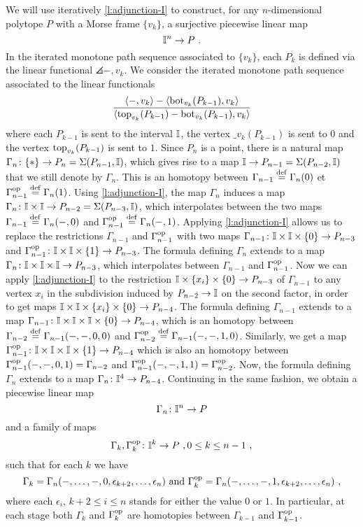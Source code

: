 We will use iteratively \cref{l:adjunction-I} to construct, for any $n$-dimensional polytope $P$ with a Morse frame $\{v_k\}$, a surjective piecewise linear map
\[
\mathbb{I}^n \to P \ .
\]
In the iterated monotone path sequence associated to $\{v_k\}$, each $P_k$ is defined via the linear functional $\angles{-,v_k}$.
We consider the iterated monotone path sequence associated to the linear functionals
\begin{equation} \label{eq:new-projection}
	\frac{\langle-,v_k\rangle-\langle\operatorname{bot}_{v_k}(P_{k-1}),v_k\rangle}{\langle\operatorname{top}_{v_k}(P_{k-1})-\operatorname{bot}_{v_k}(P_{k-1}),v_k\rangle}
\end{equation}
where each $P_{k-1}$ is sent to the interval $\mathbb{I}$, the vertex $\bm_{v_k}(P_{k-1})$ is sent to $0$ and the vertex $\operatorname{top}_{v_k}(P_{k-1})$ is sent to $1$.
Since $P_n$ is a point, there is a natural map $\Gamma_n \colon \{*\} \to P_n=\Sigma(P_{n-1},\mathbb{I})$, which gives rise to a map $\mathbb{I} \to P_{n-1}=\Sigma(P_{n-2},\mathbb{I})$ that we still denote by $\Gamma_n$. 
This is an homotopy between $\Gamma_{n-1} \stackrel{\mathrm{def}}{=} \Gamma_n(0)$ et $\Gamma_{n-1}^{\mathrm{op}} \stackrel{\mathrm{def}}{=} \Gamma_n(1)$.
Using \cref{l:adjunction-I}, the map $\Gamma_n$ induces a map $\Gamma_{n} \colon \mathbb{I} \times \mathbb{I} \to P_{n-2}=\Sigma(P_{n-3},\mathbb{I})$, which interpolates between the two maps $\Gamma_{n-1} \stackrel{\mathrm{def}}{=} \Gamma_{n}(-,0)$ and $\Gamma_{n-1}^{\mathrm{op}} \stackrel{\mathrm{def}}{=} \Gamma_{n}(-,1)$. 
Applying \cref{l:adjunction-I} allows us to replace the restrictions $\Gamma_{n-1}$ and $\Gamma_{n-1}^{\mathrm{op}}$ with two maps $\Gamma_{n-1} \colon \mathbb{I} \times \mathbb{I} \times \{0\} \to P_{n-3}$ and $\Gamma_{n-1}^{\mathrm{op}} \colon \mathbb{I} \times \mathbb{I} \times \{1\}  \to P_{n-3}$. 
The formula defining $\Gamma_{n}$ extends to a map $\Gamma_{n} \colon \mathbb{I} \times \mathbb{I} \times \mathbb{I} \to P_{n-3}$, which interpolates between $\Gamma_{n-1}$ and $\Gamma_{n-1}^{\mathrm{op}}$. 
Now we can apply \cref{l:adjunction-I} to the restriction $\mathbb{I}  \times \{x_i\} \times \{0\} \to P_{n-3}$ of $\Gamma_{n-1}$ to any vertex $x_i$ in the subdivision induced by $P_{n-2} \to \mathbb{I}$ on the second factor, in order to get maps $\mathbb{I} \times \mathbb{I} \times \{x_i\} \times \{0\} \to P_{n-4}$. 
The formula defining $\Gamma_{n-1}$ extends to a map $\Gamma_{n-1} \colon \mathbb{I} \times \mathbb{I} \times \mathbb{I} \times \{0\} \to P_{n-4}$, which is an homotopy between $\Gamma_{n-2} \stackrel{\mathrm{def}}{=} \Gamma_{n-1}(-,-,0,0)$ and $\Gamma_{n-2}^{\mathrm{op}} \stackrel{\mathrm{def}}{=} \Gamma_{n-1}(-,-,1,0)$. 
Similarly, we get a map $\Gamma_{n-1}^{\mathrm{op}} \colon \mathbb{I}  \times \mathbb{I} \times \mathbb{I} \times \{1\} \to P_{n-4}$ which is also an homotopy between $\Gamma_{n-1}^{\mathrm{op}}(-,-,0,1)=\Gamma_{n-2}$ and $\Gamma_{n-1}^{\mathrm{op}}(-,-,1,1)=\Gamma_{n-2}^{\mathrm{op}}$.
Now, the formula defining $\Gamma_n$ extends to a map $\Gamma_n \colon \mathbb{I}^4 \to P_{n-4}$. 
Continuing in the same fashion, we obtain a piecewise linear map 
\[
\Gamma_n \colon \mathbb{I}^n \to P 
\]
and a family of maps 
\[
\Gamma_k,\Gamma_k^{\mathrm{op}} \colon \mathbb{I}^k \to P \ , 0 \leq k \leq n-1 \ , 
\]
such that for each $k$ we have
\[
\Gamma_{k}=\Gamma_n(-,\ldots,-,0,\epsilon_{k+2},\ldots, \epsilon_{n})
\text{ and } 
\Gamma_{k}^{\mathrm{op}}=\Gamma_n(-,\ldots,-,1,\epsilon_{k+2},\ldots, \epsilon_{n}) \ , 
\] 
where each $\epsilon_i$, $k+2\leq i \leq n$ stands for either the value $0$ or $1$. 
In particular, at each stage both $\Gamma_k$ and $\Gamma_k^{\mathrm{op}}$ are homotopies between $\Gamma_{k-1}$ and $\Gamma_{k-1}^{\mathrm{op}}$.

